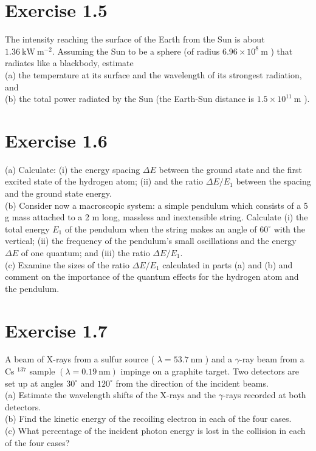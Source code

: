 \documentclass[10pt]{article}
\begin{document}
\section*{Exercise 1.5}
The intensity reaching the surface of the Earth from the Sun is about $1.36 \mathrm{~kW} \mathrm{~m}^{-2}$. Assuming the Sun to be a sphere (of radius $6.96 \times 10^{8} \mathrm{~m}$ ) that radiates like a blackbody, estimate\\
(a) the temperature at its surface and the wavelength of its strongest radiation, and\\
(b) the total power radiated by the Sun (the Earth-Sun distance is $1.5 \times 10^{11} \mathrm{~m}$ ).

\section*{Exercise 1.6}
(a) Calculate: (i) the energy spacing $\Delta E$ between the ground state and the first excited state of the hydrogen atom; (ii) and the ratio $\Delta E / E_{1}$ between the spacing and the ground state energy.\\
(b) Consider now a macroscopic system: a simple pendulum which consists of a 5 g mass attached to a 2 m long, massless and inextensible string. Calculate (i) the total energy $E_{1}$ of the pendulum when the string makes an angle of $60^{\circ}$ with the vertical; (ii) the frequency of the pendulum's small oscillations and the energy $\Delta E$ of one quantum; and (iii) the ratio $\Delta E / E_{1}$.\\
(c) Examine the sizes of the ratio $\Delta E / E_{1}$ calculated in parts (a) and (b) and comment on the importance of the quantum effects for the hydrogen atom and the pendulum.

\section*{Exercise 1.7}
A beam of X-rays from a sulfur source ( $\lambda=53.7 \mathrm{~nm}$ ) and a $\gamma$-ray beam from a Cs ${ }^{137}$ sample $(\lambda=0.19 \mathrm{~nm})$ impinge on a graphite target. Two detectors are set up at angles $30^{\circ}$ and $120^{\circ}$ from the direction of the incident beams.\\
(a) Estimate the wavelength shifts of the X-rays and the $\gamma$-rays recorded at both detectors.\\
(b) Find the kinetic energy of the recoiling electron in each of the four cases.\\
(c) What percentage of the incident photon energy is lost in the collision in each of the four cases?
\end{document}

